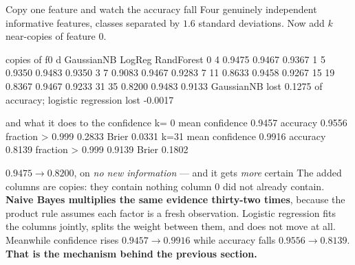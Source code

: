 \documentclass[aspectratio=169]{beamer}
\begin{document}
\begin{frame}[fragile,shrink=7]{Copy one feature and watch the accuracy fall}
Four genuinely independent informative features, classes separated by
$1.6$ standard deviations. Now add $k$ near-copies of feature $0$.
\begin{outblk}
    copies of f0    d  GaussianNB    LogReg  RandForest
               0    4      0.9475    0.9467      0.9367
               1    5      0.9350    0.9483      0.9350
               3    7      0.9083    0.9467      0.9283
               7   11      0.8633    0.9458      0.9267
              15   19      0.8367    0.9467      0.9233
              31   35      0.8200    0.9483      0.9133
   GaussianNB lost 0.1275 of accuracy; logistic regression lost -0.0017
\end{outblk}
\begin{outblk}
   and what it does to the confidence
      k= 0  mean confidence 0.9457   accuracy 0.9556   fraction > 0.999 0.2833   Brier 0.0331
      k=31  mean confidence 0.9916   accuracy 0.8139   fraction > 0.999 0.9139   Brier 0.1802
\end{outblk}
\begin{alertblock}{$0.9475 \rightarrow 0.8200$, on \emph{no new information}
--- and it gets \emph{more} certain}
  \footnotesize The added columns are copies: they contain nothing column $0$
  did not already contain. \textbf{Naive Bayes multiplies the same evidence
  thirty-two times}, because the product rule assumes each factor is a fresh
  observation. Logistic regression fits the columns jointly, splits the
  weight between them, and does not move at all. Meanwhile confidence rises
  $0.9457 \to \mathbf{0.9916}$ while accuracy falls
  $0.9556 \to \mathbf{0.8139}$. \textbf{That is the mechanism behind the
  previous section.}
\end{alertblock}
\end{frame}
\end{document}
